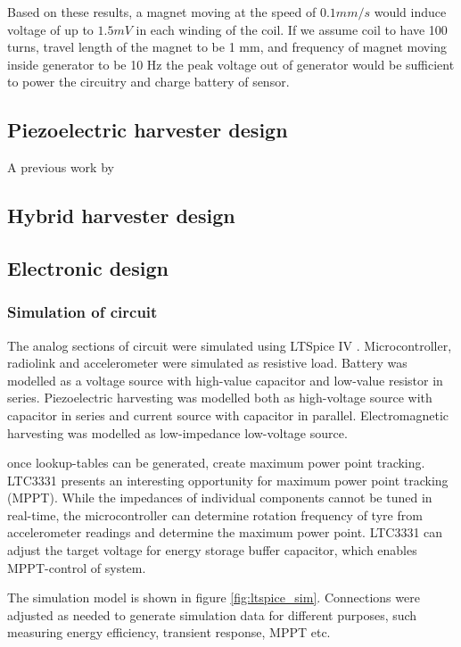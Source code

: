 Based on these results, a magnet moving at the speed of $0.1 mm / s $ would induce voltage of up to $1.5 mV$ in each winding of the coil. If we assume coil to have 100 turns, travel length of the magnet to be 1 mm, and frequency of magnet moving inside generator to be 10 Hz the peak voltage out of generator would be sufficient to power the circuitry and charge battery of sensor.

\subsection{Piezoelectric harvester design}
A previous work by 

\subsection{Hybrid harvester design}

\subsection{Electronic design}
\subsubsection{Simulation of circuit}
The analog sections of circuit were simulated using LTSpice IV \cite{ltspice}. Microcontroller, radiolink and accelerometer were simulated as resistive load. Battery was modelled as a voltage source with high-value capacitor and low-value resistor in series. Piezoelectric harvesting was modelled both as high-voltage source with capacitor in series and current source with capacitor in parallel. Electromagnetic harvesting was modelled as low-impedance low-voltage source. 

{\color{red} once lookup-tables can be generated, create maximum power point tracking.} LTC3331 presents an interesting opportunity for maximum power point tracking (MPPT). While the impedances of individual components cannot be tuned in real-time, the microcontroller can determine rotation frequency of tyre from accelerometer readings and determine the maximum power point. LTC3331 can adjust the target voltage for energy storage buffer capacitor, which enables MPPT-control of system.

The simulation model is shown in figure \ref{fig:ltspice_sim}. Connections were adjusted as needed to generate simulation data for different purposes, such measuring energy efficiency, transient response, MPPT etc.

